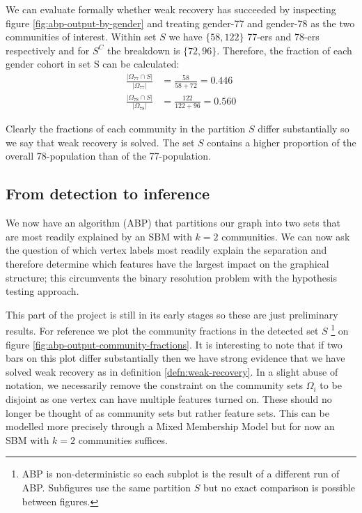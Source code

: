 \documentclass[11pt]{article}
\begin{document}
\begin{multicols*}{2}
We can evaluate formally whether weak recovery has succeeded by inspecting figure \ref{fig:abp-output-by-gender} and treating gender-77 and gender-78 as the two communities of interest. Within set $S$ we have $\{58, 122\}$ 77-ers and 78-ers respectively and for $S^C$ the breakdown is $\{72, 96\}$. Therefore, the fraction of each gender cohort in set S can be calculated:
%
\begin{equation}
	\begin{aligned}
	\frac{|\Omega_{77} \cap S|}{|\Omega_{77}|} &= \frac{58}{58+72} = 0.446 \\
	\frac{|\Omega_{78} \cap S|}{|\Omega_{78}|} &= \frac{122}{122+96} = 0.560
	\end{aligned}
\end{equation}

Clearly the fractions of each community in the partition $S$ differ substantially so we say that weak recovery is solved. The set $S$ contains a higher proportion of the overall 78-population than of the 77-population.

\subsection{From detection to inference}
\label{sect:detection-to-inference}

We now have an algorithm (ABP) that partitions our graph into two sets that are most readily explained by an SBM with $k=2$ communities. We can now ask the question of which vertex labels most readily explain the separation and therefore determine which features have the largest impact on the graphical structure; this circumvents the binary resolution problem with the hypothesis testing approach.

This part of the project is still in its early stages so these are just preliminary results. For reference we plot the community fractions in the detected set $S$
\footnote{ABP is non-deterministic so each subplot is the result of a different run of ABP. Subfigures use the same partition $S$ but no exact comparison is possible between figures.}
on figure \ref{fig:abp-output-community-fractions}. It is interesting to note that if two bars on this plot differ substantially then we have strong evidence that we have solved weak recovery as in definition \ref{defn:weak-recovery}. In a slight abuse of notation, we necessarily remove the constraint on the community sets $\Omega_i$ to be disjoint as one vertex can have multiple features turned on. These should no longer be thought of as community sets but rather feature sets. This can be modelled more precisely through a Mixed Membership Model but for now an SBM with $k=2$ communities suffices.


\end{multicols*}
\end{document}

